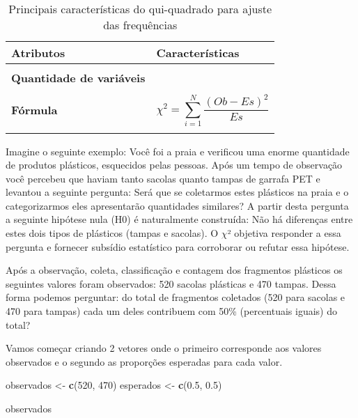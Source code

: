 \documentclass[titlepage, oneside, openany, a4paper]{book}
\newenvironment{Shaded}{\begin{snugshade}}{\end{snugshade}}
\newcommand{\DecValTok}[1]{\textcolor[rgb]{0.00,0.00,0.81}{#1}}
\newcommand{\FloatTok}[1]{\textcolor[rgb]{0.00,0.00,0.81}{#1}}
\newcommand{\KeywordTok}[1]{\textcolor[rgb]{0.13,0.29,0.53}{\textbf{#1}}}
\newcommand{\NormalTok}[1]{#1}
\newcommand{\StringTok}[1]{\textcolor[rgb]{0.31,0.60,0.02}{#1}}
\begin{document}
\begin{table}

\caption{\label{tab:tab1qui}Principais características do qui-quadrado para ajuste das frequências}
\centering
\begin{tabular}[c]{>{\raggedright\arraybackslash}p{10em}>{\raggedright\arraybackslash}p{30em}}
\toprule
Atributos & Características\\
\midrule
\textbf{\cellcolor{gray!6}{Tipo de variável}} & \cellcolor{gray!6}{Categórica}\\
\textbf{Quantidade de variáveis} & 1\\
\textbf{\cellcolor{gray!6}{Hipótese nula}} & \cellcolor{gray!6}{O número de observações em cada grupo da variável é similar ao predito pela teoria}\\
\textbf{Fórmula} & $$\chi^2=\sum^{N}_{i = 1}\frac{(Ob-Es)^2}{Es}$$\\
\textbf{\cellcolor{gray!6}{Observação}} & \cellcolor{gray!6}{Se há apenas 2 categorias, dentro da variável, não há a necessidade de post-hoc nem expressa-la graficamente}\\
\bottomrule
\end{tabular}
\end{table}

Imagine o seguinte exemplo: Você foi a praia e verificou uma enorme quantidade de produtos plásticos, esquecidos pelas pessoas. Após um tempo de observação você percebeu que haviam tanto sacolas quanto tampas de garrafa PET e levantou a seguinte pergunta: Será que se coletarmos estes plásticos na praia e o categorizarmos eles apresentarão quantidades similares? A partir desta pergunta a seguinte hipótese nula (H0) é naturalmente construída: Não há diferenças entre estes dois tipos de plásticos (tampas e sacolas). O \(\chi\)² objetiva responder a essa pergunta e fornecer subsídio estatístico para corroborar ou refutar essa hipótese.

Após a observação, coleta, classificação e contagem dos fragmentos plásticos os seguintes valores foram observados: 520 sacolas plásticas e 470 tampas. Dessa forma podemos perguntar: do total de fragmentos coletados (520 para sacolas e 470 para tampas) cada um deles contribuem com 50\% (percentuais iguais) do total?

Vamos começar criando 2 vetores onde o primeiro corresponde aos valores observados e o segundo as proporções esperadas para cada valor.

\begin{Shaded}
\begin{Highlighting}[]
\NormalTok{observados <-}\StringTok{ }\KeywordTok{c}\NormalTok{(}\DecValTok{520}\NormalTok{, }\DecValTok{470}\NormalTok{)}
\NormalTok{esperados <-}\StringTok{ }\KeywordTok{c}\NormalTok{(}\FloatTok{0.5}\NormalTok{, }\FloatTok{0.5}\NormalTok{)}

\NormalTok{observados}
\end{Highlighting}
\end{Shaded}
\end{document}
